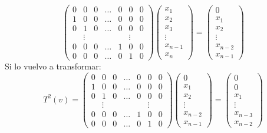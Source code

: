 \begin{enumerate}
\begin{mdframed}[style=s]
\[\begin{pmatrix}
                    0&0&0&\dots&0&0&0\\
                    1&0&0&\dots&0&0&0\\
                    0&1&0&\dots&0&0&0\\
                    &\vdots&&&&\vdots&\\
                    0&0&0&\dots&1&0&0\\
                    0&0&0&\dots&0&1&0
                \end{pmatrix}\begin{pmatrix}
                    x_1\\x_2\\x_3\\\vdots\\x_{n-1}\\x_n
                \end{pmatrix}=\begin{pmatrix}
                    0\\x_1\\x_2\\\vdots\\x_{n-2}\\x_{n-1}
                \end{pmatrix}\]
                Si lo vuelvo a transformar:
                \[T^2(v)=\begin{pmatrix}
                    0&0&0&\dots&0&0&0\\
                    1&0&0&\dots&0&0&0\\
                    0&1&0&\dots&0&0&0\\
                    &\vdots&&&&\vdots&\\
                    0&0&0&\dots&1&0&0\\
                    0&0&0&\dots&0&1&0
                \end{pmatrix}\begin{pmatrix}
                    0\\x_1\\x_2\\\vdots\\x_{n-2}\\x_{n-1}
                \end{pmatrix}=\begin{pmatrix}
                    0\\0\\x_1\\\vdots\\x_{n-3}\\x_{n-2}

\end{pmatrix}\]
\end{mdframed}
\end{enumerate}
